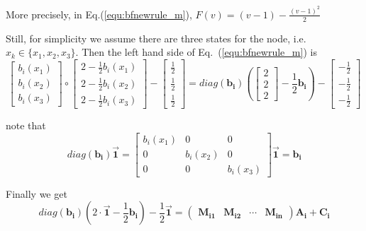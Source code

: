 More precisely, in Eq.(\ref{equ:bfnewrule_m}), $F(v) = (v - 1) - \frac{(v -1)^2 }{2}$

Still, for simplicity we assume there are three states for the node, i.e. $x_k\in \{x_1, x_2, x_3\}$. Then the left hand side of Eq.~(\ref{equ:bfnewrule_m}) is
\begin{equation}
\left[ \begin{array}{c}
b_i(x_1) \\
b_i(x_2) \\
b_i(x_3) \end{array} \right]
\circ
\left[ \begin{array}{c}
2-\frac{1}{2}b_i(x_1) \\
2-\frac{1}{2}b_i(x_2)\\
2-\frac{1}{2}b_i(x_3)\end{array} \right]
-
\left[ \begin{array}{c}
\frac{1}{2} \\
\frac{1}{2} \\
\frac{1}{2} \end{array} \right]
=
diag(\mathbf{b_i})(
\left[ \begin{array}{c}
2\\
2\\
2\end{array} \right]
-\frac{1}{2}\mathbf{b_i})
-
\left[ \begin{array}{c}
-\frac{1}{2} \\
-\frac{1}{2} \\
-\frac{1}{2} \end{array} \right]
\end{equation}

note that
\begin{equation}
diag(\mathbf{b_i}) \vec{\mathbf{1}}= \left[ \begin{array}{ccc}
b_i(x_1)&0&0 \\
0&b_i(x_2)&0 \\
0&0&b_i(x_3) \end{array} \right]\vec{\mathbf{1}}= \mathbf{b_i}
\end{equation}

Finally we get
\begin{equation}
\label{eq:newquadraticapprox}
diag(\mathbf{b_i})
(2\cdot\vec{\mathbf{1}}
-\frac{1}{2}\mathbf{b_i})-
\frac{1}{2}\vec{\mathbf{1}}
= \left( \begin{array}{cccc}
\mathbf{M_{i1}}&\mathbf{M_{i2}}&\cdots& \mathbf{M_{in}}\end{array} \right)\mathbf{A_i}+\mathbf{C_i}
\end{equation}

